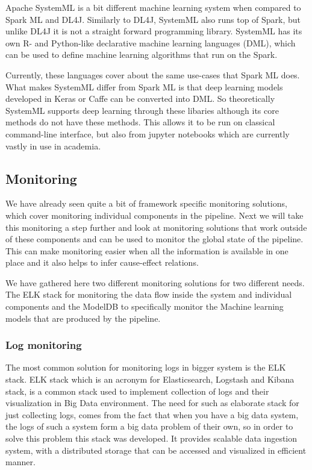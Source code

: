 Apache SystemML is a bit different machine learning system when compared to Spark ML and DL4J.
Similarly to DL4J, SystemML also runs top of Spark, but unlike DL4J it is not a straight forward programming library.
SystemML has its own R- and Python-like declarative machine learning languages (DML), which can be used to define machine learning algorithms that run on the Spark. \cite{systemml}

Currently, these languages cover about the same use-cases that Spark ML does.
What makes SystemML differ from Spark ML is that deep learning models developed in Keras or Caffe can be converted into DML.
So theoretically SystemML supports deep learning through these libaries although its core methods do not have these methods.
This allows it to be run on classical command-line interface, but also from jupyter notebooks which are currently vastly in use in academia. \cite{systemml}

\subsection{Monitoring}

We have already seen quite a bit of framework specific monitoring solutions, which cover monitoring individual components in the pipeline.
Next we will take this monitoring a step further and look at monitoring solutions that work outside of these components and can be used to monitor the global state of the pipeline.
This can make monitoring easier when all the information is available in one place and it also helps to infer cause-effect relations.

We have gathered here two different monitoring solutions for two different needs.
The ELK stack for monitoring the data flow inside the system and individual components and the ModelDB to specifically monitor the Machine learning models that are produced by the pipeline.

\subsubsection{Log monitoring}

The most common solution for monitoring logs in bigger system is the ELK stack. 
ELK stack which is an acronym for Elasticsearch, Logstash and Kibana stack, is a common stack used to implement collection of logs and their visualization in Big Data environment.
The need for such as elaborate stack for just collecting logs, comes from the fact that when you have a big data system, the logs of such a system form a big data problem of their own, so in order to solve this problem this stack was developed.
It provides scalable data ingestion system, with a distributed storage that can be accessed and visualized in efficient manner. \cite{elastic}

